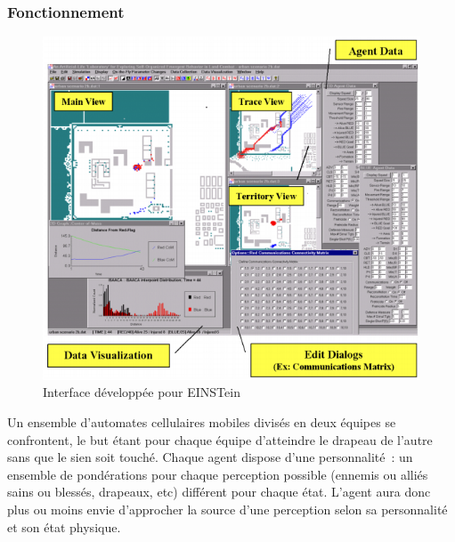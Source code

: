 \documentclass{article}
\begin{document}
\subsubsection{Fonctionnement}

\begin{center}
\begin{figure}[H]
	\begin{centering}
	\includegraphics[width=0.9\linewidth]{../ressources/Einstein}
	\caption{Interface développée pour EINSTein}
	\end{centering}
\end{figure}
\cite{simu_guerre,ilachinski1994,ilachinski1999}
\end{center}

Un ensemble d'automates cellulaires mobiles divisés en deux équipes se confrontent, le but étant pour chaque équipe d'atteindre le drapeau de l'autre sans que le sien soit touché. Chaque agent dispose d'une personnalité~: un ensemble de pondérations pour chaque perception possible (ennemis ou alliés sains ou blessés, drapeaux, etc) différent pour chaque état. L'agent aura donc plus ou moins envie d'approcher la source d'une perception selon sa personnalité et son état physique.
\end{document}
